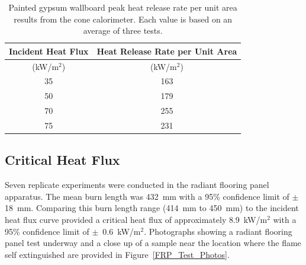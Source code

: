 \documentclass[twoside]{uocthesis}
\begin{document}
{\begin{table}
	\centering
	\begin{tabular}{|c|c|}
		\hline Incident Heat Flux & Heat Release Rate per Unit Area    \\
		\hline (kW/m$^2$) & (kW/m$^2$)  \\ 
		\hline 35 	& 163 	\\
		\hline 50	& 179   \\
		\hline 70	& 255  	\\
		\hline 75	& 231 	\\
		\hline
	\end{tabular}
	\caption[Painted gypsum wallboard peak heat release rate per unit area results]{Painted gypsum wallboard peak heat release rate per unit area results from the cone calorimeter. Each value is based on an average of three tests.}
	\label{tab:Gypsum wallboard_HRRA}
\end{table}

\subsection{Critical Heat Flux}

Seven replicate experiments were conducted in the radiant flooring panel apparatus.  The mean burn length was 432~mm with a 95$\%$ confidence limit of $\pm$ 18~mm. Comparing this burn length range (414~mm to 450~mm) to the incident heat flux curve provided a critical heat flux of approximately 8.9~kW/m$^2$ with a 95$\%$ confidence limit of $\pm$~0.6~kW/m$^2$.  Photographs showing a radiant flooring panel test underway and a close up of a sample near the location where the flame self extinguished are provided in Figure~\ref{FRP_Test_Photos}. 

}
\end{document}
